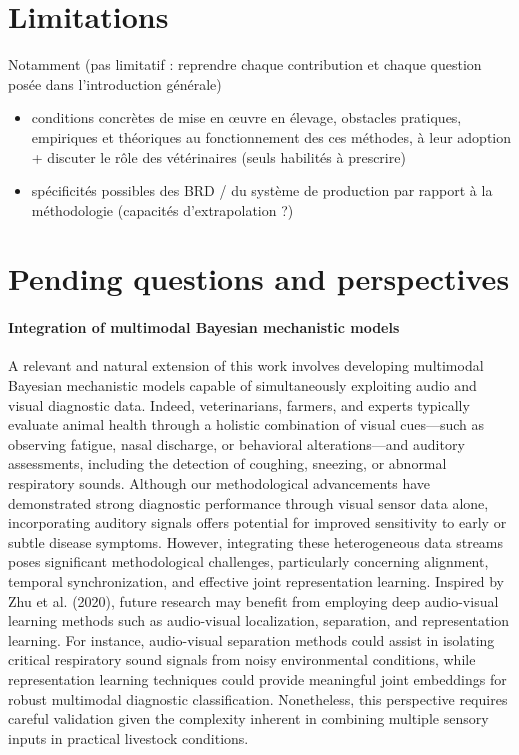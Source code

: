 \section{Limitations}
Notamment (pas limitatif : reprendre chaque contribution et chaque question posée dans l'introduction générale)
\begin{itemize}
    \item conditions concrètes de mise en \oe{}uvre en élevage, obstacles pratiques, empiriques et théoriques au fonctionnement des ces méthodes, à leur adoption + discuter le rôle des vétérinaires (seuls habilités à prescrire)
    \item spécificités possibles des BRD / du système de production par rapport à la méthodologie (capacités d'extrapolation ?)
\end{itemize}

\section{Pending questions and perspectives}


\paragraph{Integration of multimodal Bayesian mechanistic models} A relevant and natural extension of this work involves developing multimodal Bayesian mechanistic models capable of simultaneously exploiting audio and visual diagnostic data. Indeed, veterinarians, farmers, and experts typically evaluate animal health through a holistic combination of visual cues—such as observing fatigue, nasal discharge, or behavioral alterations—and auditory assessments, including the detection of coughing, sneezing, or abnormal respiratory sounds. Although our methodological advancements have demonstrated strong diagnostic performance through visual sensor data alone, incorporating auditory signals offers potential for improved sensitivity to early or subtle disease symptoms. However, integrating these heterogeneous data streams poses significant methodological challenges, particularly concerning alignment, temporal synchronization, and effective joint representation learning. Inspired by Zhu et al. (2020), future research may benefit from employing deep audio-visual learning methods such as audio-visual localization, separation, and representation learning. For instance, audio-visual separation methods could assist in isolating critical respiratory sound signals from noisy environmental conditions, while representation learning techniques could provide meaningful joint embeddings for robust multimodal diagnostic classification. Nonetheless, this perspective requires careful validation given the complexity inherent in combining multiple sensory inputs in practical livestock conditions.
 

